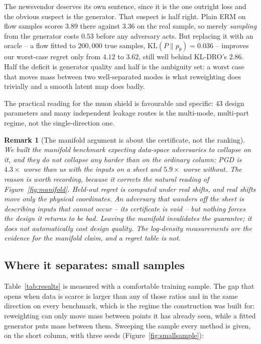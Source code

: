 \documentclass[11pt]{article}
\newtheorem{remark}{Remark}
\begin{document}
The newsvendor deserves its own sentence, since it is the one outright loss and the
obvious suspect is the generator. That suspect is half right. Plain ERM on flow samples
scores $3.89$ there against $3.36$ on the real sample, so merely \emph{sampling} from the
generator costs $0.53$ before any adversary acts. But replacing it with an oracle -- a flow
fitted to $200{,}000$ true samples, $\mathrm{KL}(P\|p_\theta)=0.036$ -- improves our
worst-case regret only from $4.12$ to $3.62$, still well behind KL-DRO's $2.86$. Half the
deficit is generator quality and half is the ambiguity set: a worst case that moves mass
between two well-separated modes is what reweighting does trivially and a smooth latent map
does badly.

The practical reading for the muon shield is favourable and specific: $43$ design
parameters and many independent leakage routes is the multi-mode, multi-part regime, not
the single-direction one.

\begin{remark}[The manifold argument is about the certificate, not the ranking]
\label{rem:manifold}
We built the manifold benchmark expecting data-space adversaries to collapse on it, and
they do not collapse any harder than on the ordinary column: PGD is $4.3\times$ worse than
us with the inputs on a sheet and $5.9\times$ worse without. The reason is worth recording,
because it corrects the natural reading of Figure~\ref{fig:manifold}. Held-out regret is
computed under real shifts, and real shifts move only the physical coordinates. An
adversary that wanders off the sheet is describing inputs that cannot occur -- its
\emph{certificate} is void -- but nothing forces the design it returns to be bad. Leaving
the manifold invalidates the guarantee; it does not automatically cost design quality. The
log-density measurements are the evidence for the manifold claim, and a regret table is not.
\end{remark}

\subsection{Where it separates: small samples}
\label{sec:smallsample}

Table~\ref{tab:results} is measured with a comfortable training sample. The gap that opens
when data is scarce is larger than any of those ratios and in the same direction on every
benchmark, which is the regime the construction was built for: reweighting can only move
mass between points it has already seen, while a fitted generator puts mass between them.
Sweeping the sample every method is given, on the short column, with three seeds
(Figure~\ref{fig:smallsample}):
\end{document}
